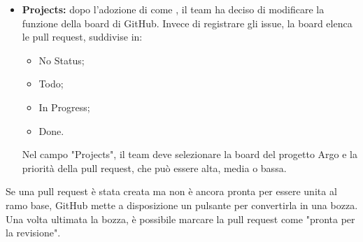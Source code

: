 \begin{itemize}
\begin{itemize}
  \end{itemize}
  \item \textbf{Projects:} dopo l'adozione di  come , il team ha deciso di modificare la funzione della board di GitHub. Invece di registrare gli issue, la board elenca le pull request, suddivise in:
  \begin{itemize}
    \item No Status;
    \item Todo;
    \item In Progress;
    \item Done.
  \end{itemize}
  \par Nel campo "Projects", il team deve selezionare la board del progetto Argo e la priorità della pull request, che può essere alta, media o bassa.
\end{itemize}
\par Se una pull request è stata creata ma non è ancora pronta per essere unita al ramo base, GitHub mette a disposizione un pulsante per convertirla in una bozza. Una volta ultimata la bozza, è possibile marcare la pull request come "pronta per la revisione".

